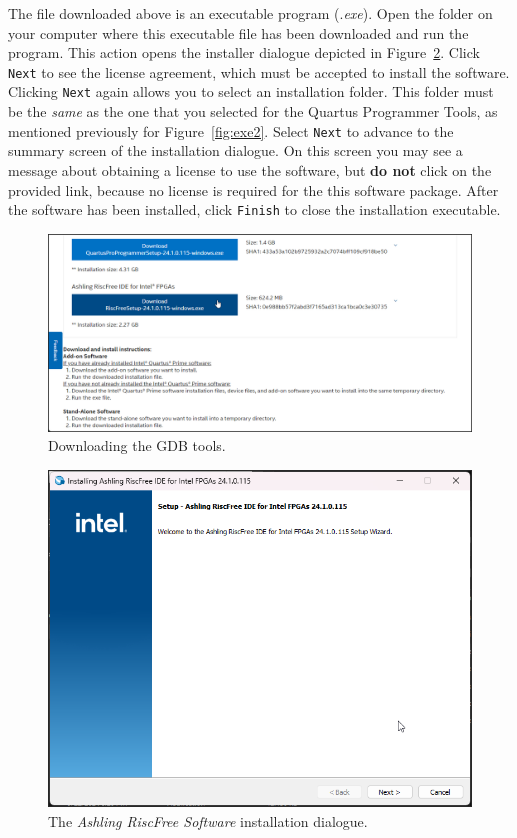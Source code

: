 \documentclass[11pt, twoside, pdftex]{article}
\begin{document}
The file downloaded above is an executable program (.{\it exe}).  Open the folder 
on your computer where this executable file has been downloaded and run the program.
This action opens the installer dialogue depicted in Figure~\ref{fig:exe3}. 
Click \texttt{Next} to see the license agreement, which
must be accepted to install the software. Clicking \texttt{Next} again allows you to
select an installation folder. This folder must be the {\it same} as the one that you
selected for the Quartus Programmer Tools, as mentioned previously for 
Figure~\ref{fig:exe2}. Select \texttt{Next} 
to advance to the summary screen of the installation dialogue. On this screen you may see a 
message about obtaining a license to use the software, but {\bf do not} click on the 
provided link, because no license is required for the this software package. After the
software has been installed, click \texttt{Finish} to close the installation executable.

\begin{figure}[H]
    \begin{center}
        \includegraphics[width=.9\linewidth]{figures/down3.png}
        \caption{Downloading the GDB tools.}
        \label{fig:down3}
    \end{center}
\end{figure}

\begin{figure}[h]
    \begin{center}
        \includegraphics[scale=0.66]{figures/exe3.png}
        \caption{The {\it Ashling RiscFree Software} installation dialogue.}
        \label{fig:exe3}
    \end{center}
\end{figure}
\end{document}
